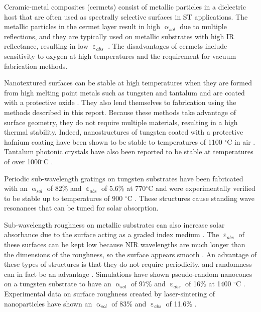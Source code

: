 \documentclass[10pt,letterpaper]{article}
\begin{document}
Ceramic-metal composites (cermets) consist of metallic particles in a dielectric host that are often used as spectrally selective surfaces in ST applications.  The metallic particles in the cermet layer result in high $\upalpha_{sol}$ due to multiple reflections, and they are typically used on metallic substrates with high IR reflectance, resulting in low $\upepsilon_{abs}$ \cite{A2,A4,A5,A6,A7,A8,A9,A10}.  The disadvantages of cermets include sensitivity to oxygen at high temperatures and the requirement for vacuum fabrication methods.

Nanotextured surfaces can be stable at high temperatures when they are 
formed from high melting point metals such as tungsten and tantalum and are coated with a protective oxide \cite{paper1_ref5}.  They also lend themselves to fabrication using the methods described in this report.  Because these methods take advantage of surface geometry, they do not require multiple materials, resulting in a high thermal stability.  Indeed, nanostructures of tungsten coated with a protective hafnium coating have been shown to be stable to temperatures of 1100 $^\circ$C in air \cite{paper1_ref5,Therm_stabil_W_microstructures}.  Tantalum photonic crystals have also been reported to be stable at temperatures of over 1000$^\circ$C \cite{photonic_crystal_rev}.

Periodic sub-wavelength gratings on tungsten substrates have been fabricated with an $\upalpha_{sol}$ of 82\% and $\upepsilon_{abs}$ of 5.6\% at 770$^\circ$C and were experimentally verified to be 
stable up to temperatures of 900 $^\circ$C \cite{A13}.  These structures cause standing wave resonances that can be tuned for solar absorption.

Sub-wavelength roughness on metallic substrates can also increase solar absorbance due to the surface acting as a graded index medium \cite{A13,A19}.  The $\upepsilon_{abs}$ of these surfaces can be kept low because NIR wavelengths are much longer than the dimensions of the roughness, so the surface appears smooth \cite{A14}.  An advantage of these types of structures is that they do not require periodicity, and randomness can in fact be an advantage \cite{me1}.  Simulations have shown pseudo-random nanocones on a tungsten substrate to have an $\upalpha_{sol}$ of 97\% and $\upepsilon_{abs}$ of 16\% at 1400 $^\circ$C \cite{me1}.  Experimental data on surface roughness created by laser-sintering of nanoparticles have shown an $\upalpha_{sol}$ of 83\% and $\upepsilon_{abs}$ of 11.6\% \cite{g21}.
\end{document}
